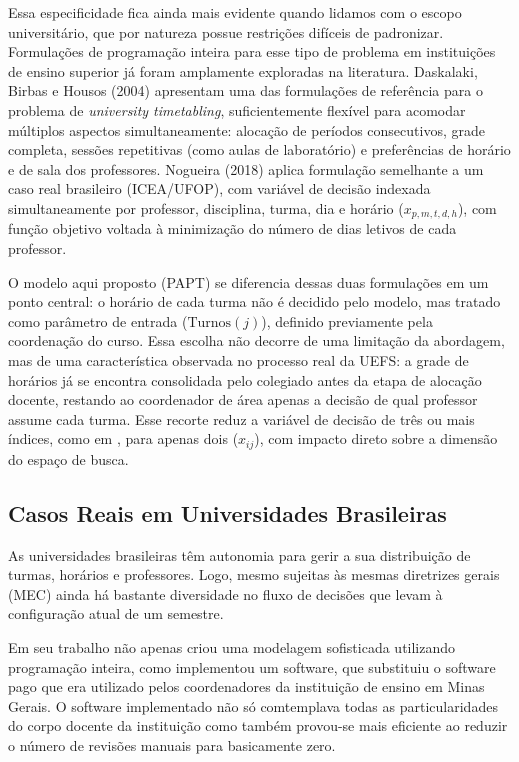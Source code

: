 \documentclass[11pt,a4paper]{article}
\begin{document}
Essa especificidade fica ainda mais evidente quando lidamos com o escopo universitário, que por natureza possue restrições difíceis de padronizar. Formulações de programação inteira para esse tipo de problema em instituições de ensino superior já foram amplamente exploradas na literatura. Daskalaki, Birbas e Housos (2004) \cite{daskalaki2004} apresentam uma das formulações de referência para o problema de \emph{university timetabling}, suficientemente flexível para acomodar múltiplos aspectos simultaneamente: alocação de períodos consecutivos, grade completa, sessões repetitivas (como aulas de laboratório) e preferências de horário e de sala dos professores. Nogueira (2018) \cite{nogueira2018} aplica formulação semelhante a um caso real brasileiro (ICEA/UFOP), com variável de decisão indexada simultaneamente por
professor, disciplina, turma, dia e horário ($x_{p,m,t,d,h}$), com função objetivo voltada à minimização do número de dias letivos de cada professor.

O modelo aqui proposto (PAPT) se diferencia dessas duas formulações em um
ponto central: o horário de cada turma não é decidido pelo modelo, mas tratado como parâmetro de entrada ($\text{Turnos}(j)$), definido previamente pela coordenação do curso. Essa escolha não decorre de uma limitação da abordagem, mas de uma característica observada no processo real da UEFS: a grade de horários já se encontra consolidada pelo colegiado antes da etapa de alocação docente, restando ao coordenador
de área apenas a decisão de qual professor assume cada turma. Esse recorte reduz a variável de decisão de três ou mais índices, como em \cite{nogueira2018}, para apenas dois ($x_{ij}$), com impacto direto sobre a dimensão do espaço de busca.

\subsection{Casos Reais em Universidades Brasileiras}

As universidades brasileiras têm autonomia para gerir a sua distribuição de turmas, horários e professores. Logo, mesmo sujeitas às mesmas diretrizes gerais (MEC) ainda há bastante diversidade no fluxo de decisões que levam à configuração atual de um semestre.

Em seu trabalho \cite{modesto2025} não apenas criou uma modelagem sofisticada utilizando programação inteira, como implementou um software, que substituiu o software pago que era utilizado pelos coordenadores da instituição de ensino em Minas Gerais. O software implementado não só comtemplava todas as particularidades do corpo docente da instituição como também provou-se mais eficiente ao reduzir o número de revisões manuais para basicamente zero. 
\end{document}
